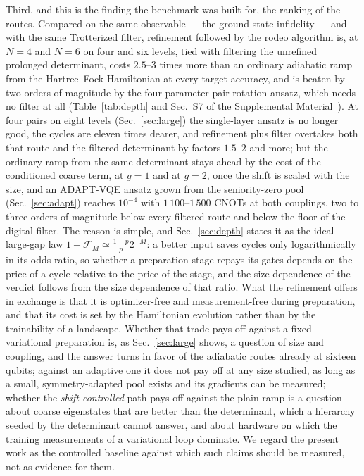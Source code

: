 \documentclass[
  aps,            %
  prc,            %
  reprint,        %
  superscriptaddress,
  floatfix,
  nofootinbib
]{revtex4-2}
\newcommand{\SM}{Supplemental Material~\cite{SM}}
\begin{document}
Third, and this is the finding the benchmark was built for, the ranking of
the routes.  Compared on the same observable --- the ground-state
infidelity --- and with the same Trotterized filter, refinement followed by
the rodeo algorithm is, at $N=4$ and $N=6$ on four and six levels, tied with
filtering the unrefined prolonged determinant, costs $2.5$--$3$ times more
than an ordinary adiabatic ramp from the Hartree--Fock Hamiltonian at every
target accuracy, and is beaten by two orders of magnitude by the
four-parameter pair-rotation ansatz, which needs no filter at all
(Table~\ref{tab:depth} and Sec.~S7 of the \SM{}).  At four pairs on eight
levels (Sec.~\ref{sec:large}) the single-layer ansatz is no longer good,
the cycles are eleven times dearer, and refinement plus filter overtakes
both that route and the filtered determinant by factors $1.5$--$2$ and
more; but the ordinary ramp from the same determinant stays ahead by the
cost of the conditioned coarse term, at $g=1$ and at $g=2$, once the shift
is scaled with the size, and an ADAPT-VQE ansatz grown from the
seniority-zero pool (Sec.~\ref{sec:adapt}) reaches $10^{-4}$ with
$1\,100$--$1\,500$ CNOTs at both couplings, two to three orders of
magnitude below every filtered route and below the floor of the digital
filter.  The reason is simple, and
Sec.~\ref{sec:depth} states it as the ideal large-gap law
$1-\mathcal F_M\simeq\tfrac{1-p}{p}2^{-M}$: a better input saves cycles only
logarithmically in its odds ratio, so whether a preparation stage repays its
gates depends on the price of a cycle relative to the price of the stage,
and the size dependence of the verdict follows from the size dependence of
that ratio.  What the refinement offers in exchange is that it is
optimizer-free and measurement-free during preparation, and that its cost is
set by the Hamiltonian evolution rather than by the trainability of a
landscape.  Whether that trade pays off against a fixed variational preparation
is, as Sec.~\ref{sec:large} shows, a question of size and coupling, and the
answer turns in favor of the adiabatic routes already at sixteen qubits;
against an adaptive one it does not pay off at any size studied, as long as
a small, symmetry-adapted pool exists and its gradients can be measured;
whether the \emph{shift-controlled} path pays off against the plain ramp is
a question about coarse eigenstates that are better than the determinant,
which a hierarchy seeded by the determinant cannot answer, and about
hardware on which the training measurements of a variational loop
dominate.  We regard the present work as the controlled baseline against
which such claims should be measured, not as evidence for them.
\end{document}
